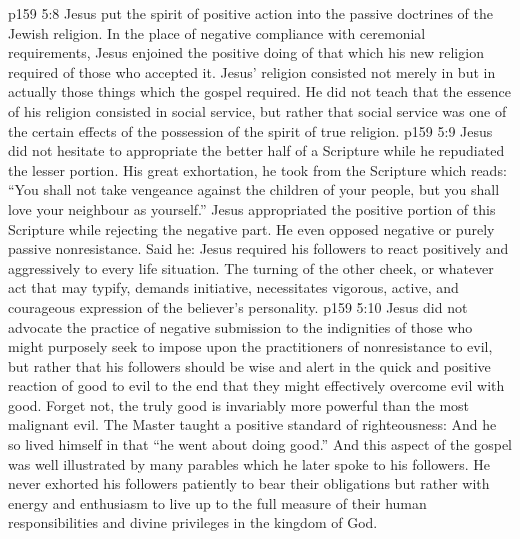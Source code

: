 \vs p159 5:8 Jesus put the spirit of positive action into the passive doctrines of the Jewish religion. In the place of negative compliance with ceremonial requirements, Jesus enjoined the positive doing of that which his new religion required of those who accepted it. Jesus’ religion consisted not merely in  but in actually  those things which the gospel required. He did not teach that the essence of his religion consisted in social service, but rather that social service was one of the certain effects of the possession of the spirit of true religion.
\vs p159 5:9 Jesus did not hesitate to appropriate the better half of a Scripture while he repudiated the lesser portion. His great exhortation,  he took from the Scripture which reads: “You shall not take vengeance against the children of your people, but you shall love your neighbour as yourself.” Jesus appropriated the positive portion of this Scripture while rejecting the negative part. He even opposed negative or purely passive nonresistance. Said he:  Jesus required his followers to react positively and aggressively to every life situation. The turning of the other cheek, or whatever act that may typify, demands initiative, necessitates vigorous, active, and courageous expression of the believer’s personality.
\vs p159 5:10 Jesus did not advocate the practice of negative submission to the indignities of those who might purposely seek to impose upon the practitioners of nonresistance to evil, but rather that his followers should be wise and alert in the quick and positive reaction of good to evil to the end that they might effectively overcome evil with good. Forget not, the truly good is invariably more powerful than the most malignant evil. The Master taught a positive standard of righteousness:  And he so lived himself in that “he went about doing good.” And this aspect of the gospel was well illustrated by many parables which he later spoke to his followers. He never exhorted his followers patiently to bear their obligations but rather with energy and enthusiasm to live up to the full measure of their human responsibilities and divine privileges in the kingdom of God.

